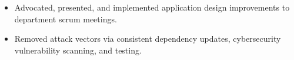 \documentclass[overlapped]{res}
\begin{document}
\begin{resume}
\begin{itemize}
    \item Advocated, presented, and implemented application design improvements to department scrum meetings.
    \item Removed attack vectors via consistent dependency updates, cybersecurity vulnerability scanning, and testing.
\end{itemize}









\end{resume}
\end{document}
